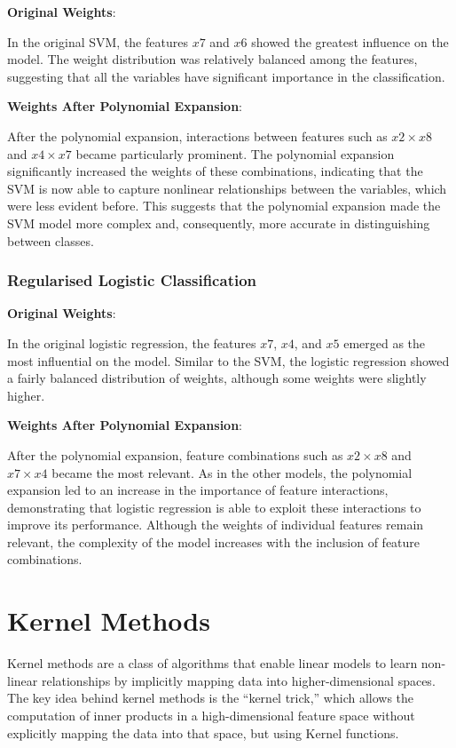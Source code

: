 \documentclass[a4paper, 10pt]{article}
\begin{document}
\textbf{Original Weights}: 

In the original SVM, the features \( x7 \) and \( x6 \) showed the greatest influence on the model. The weight distribution was relatively balanced among the features, suggesting that all the variables have significant importance in the classification.

\vspace{0.5cm}
\noindent \textbf{Weights After Polynomial Expansion}: 

After the polynomial expansion, interactions between features such as \( x2 \times x8 \) and \( x4 \times x7 \) became particularly prominent. The polynomial expansion significantly increased the weights of these combinations, indicating that the SVM is now able to capture nonlinear relationships between the variables, which were less evident before. This suggests that the polynomial expansion made the SVM model more complex and, consequently, more accurate in distinguishing between classes.

\subsubsection{Regularised Logistic Classification}


\textbf{Original Weights}: 

In the original logistic regression, the features \( x7 \), \( x4 \), and \( x5 \) emerged as the most influential on the model. Similar to the SVM, the logistic regression showed a fairly balanced distribution of weights, although some weights were slightly higher.

\vspace{0.5cm}

\noindent \textbf{Weights After Polynomial Expansion}: 

After the polynomial expansion, feature combinations such as \( x2 \times x8 \) and \( x7 \times x4 \) became the most relevant. As in the other models, the polynomial expansion led to an increase in the importance of feature interactions, demonstrating that logistic regression is able to exploit these interactions to improve its performance. Although the weights of individual features remain relevant, the complexity of the model increases with the inclusion of feature combinations.


\newpage



\section{Kernel Methods}
Kernel methods are a class of algorithms that enable linear models to learn non-linear relationships by implicitly mapping data into higher-dimensional spaces. The key idea behind kernel methods is the “kernel trick,” which allows the computation of inner products in a high-dimensional feature space without explicitly mapping the data into that space, but using Kernel functions.
\end{document}
